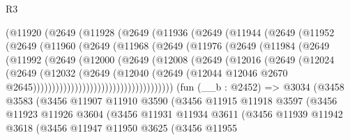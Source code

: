 \begin{lexlean}{R3}
\begin{coremodule}
            (@11920
              (@2649
                (@11928
                  (@2649
                    (@11936
                      (@2649
                        (@11944
                          (@2649
                            (@11952
                              (@2649
                                (@11960
                                  (@2649
                                    (@11968
                                      (@2649
                                        (@11976
                                          (@2649
                                            (@11984
                                              (@2649
                                                (@11992
                                                  (@2649
                                                    (@12000
                                                      (@2649
                                                        (@12008
                                                          (@2649
                                                            (@12016
                                                              (@2649
                                                                (@12024
                                                                  (@2649
                                                                    (@12032
                                                                      (@2649
                                                                        (@12040
                                                                          (@2649
                                                                            (@12044
                                                                              @12046
                                                                              @2670
                                                                              @2645)))))))))))))))))))))))))))))))))))))
    (fun (__b : @2452) =>
    @3034
      (@3458
        @3583
        (@3456
          @11907
          @11910
          @3590
          (@3456
            @11915
            @11918
            @3597
            (@3456
              @11923
              @11926
              @3604
              (@3456
                @11931
                @11934
                @3611
                (@3456
                  @11939
                  @11942
                  @3618
                  (@3456
                    @11947
                    @11950
                    @3625
                    (@3456
                      @11955

\end{coremodule}
\end{lexlean}
